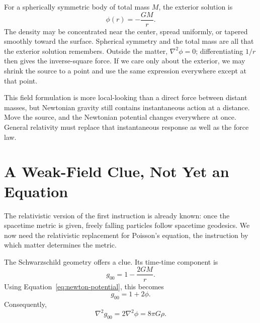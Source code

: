 For a spherically symmetric body of total mass \(M\), the exterior solution is
\begin{equation}
 \phi(r)=-\frac{GM}{r}.
 \label{eq:newton-potential}
\end{equation}
The density may be concentrated near the center, spread uniformly, or tapered
smoothly toward the surface. Spherical symmetry and the total mass are all
that the exterior solution remembers. Outside the matter,
\(\nabla^2\phi=0\); differentiating \(1/r\) then gives the inverse-square
force. If we care only about the exterior, we may shrink the source to a
point and use the same expression everywhere except at that point.

\begin{classroomqa}
\end{classroomqa}

This field formulation is more local-looking than a direct force between
distant masses, but Newtonian gravity still contains instantaneous action at
a distance. Move the source, and the Newtonian potential changes everywhere
at once. General relativity must replace that instantaneous response as well
as the force law.

\section{A Weak-Field Clue, Not Yet an Equation}

The relativistic version of the first instruction is already known: once the
spacetime metric is given, freely falling particles follow spacetime
geodesics. We now need the relativistic replacement for Poisson's equation,
the instruction by which matter determines the metric.

The Schwarzschild geometry offers a clue. Its time-time component is
\begin{equation}
 g_{00}=1-\frac{2GM}{r}.
\end{equation}
Using Equation~\eqref{eq:newton-potential}, this becomes
\begin{equation}
 g_{00}=1+2\phi.
\end{equation}
Consequently,
\begin{equation}
 \nabla^2g_{00}=2\nabla^2\phi=8\pi G\rho.
 \label{eq:weak-mnemonic}
\end{equation}

